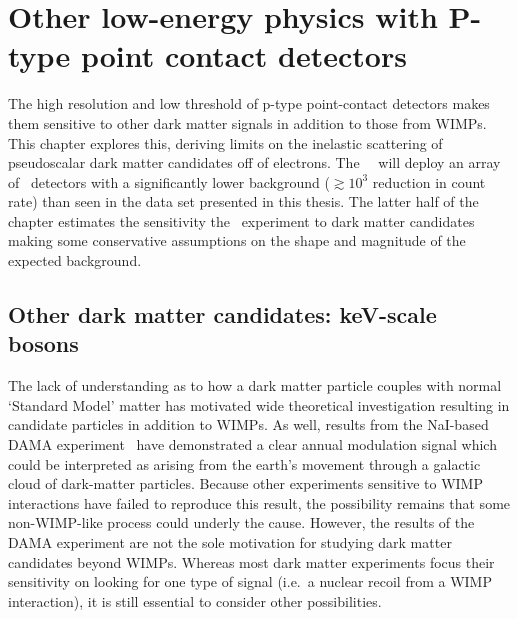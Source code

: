 \chapter{Other low-energy physics with P-type point contact detectors}

	

	The high resolution and low threshold of p-type point-contact detectors makes them sensitive to other dark matter signals in addition to those from WIMPs.  This chapter explores this, deriving limits on the inelastic scattering of pseudoscalar dark matter candidates off of electrons.  The \MJ~\minmod~will deploy an array of \ppc~detectors with a significantly lower background ($\gtrsim10^{3}$ reduction in count rate) than seen in the data set presented in this thesis.  The latter half of the chapter estimates the sensitivity the \MJ~experiment to dark matter candidates making some conservative assumptions on the shape and magnitude of the expected background.  
		
	\section{Other dark matter candidates: keV-scale bosons}
	\label{sec:CalcLimitsOnHeavyAxions}		

	The lack of understanding as to how a dark matter particle couples with normal `Standard Model' matter has motivated wide theoretical investigation resulting in candidate particles in addition to WIMPs.  As well, results from the NaI-based DAMA experiment~\cite{Bernabei:2005ca} have demonstrated a clear annual modulation signal which could be interpreted as arising from the earth's movement through a galactic cloud of dark-matter particles.  Because other experiments sensitive to WIMP interactions have failed to reproduce this result, the possibility remains that some non-WIMP-like process could underly the cause.  However, the results of the DAMA experiment are not the sole motivation for studying dark matter candidates beyond WIMPs.  Whereas most dark matter experiments focus their sensitivity on looking for one type of signal (i.e.~a nuclear recoil from a WIMP interaction), it is still essential to consider other possibilities.  
	
